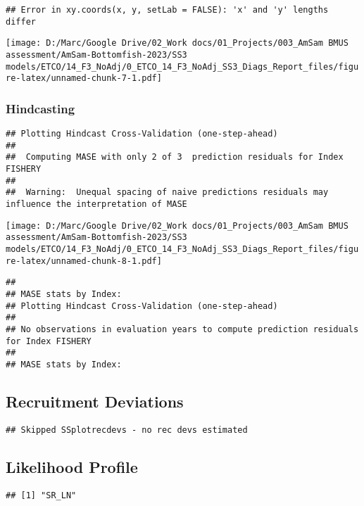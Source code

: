 \documentclass[
]{article}
\begin{document}
\begin{verbatim}
## Error in xy.coords(x, y, setLab = FALSE): 'x' and 'y' lengths differ
\end{verbatim}

\texttt{[image: D:/Marc/Google Drive/02\_Work docs/01\_Projects/003\_AmSam BMUS assessment/AmSam-Bottomfish-2023/SS3 models/ETCO/14\_F3\_NoAdj/0\_ETCO\_14\_F3\_NoAdj\_SS3\_Diags\_Report\_files/figure-latex/unnamed-chunk-7-1.pdf]}

\hypertarget{hindcasting}{%
\subsubsection{Hindcasting}\label{hindcasting}}

\begin{verbatim}
## Plotting Hindcast Cross-Validation (one-step-ahead) 
## 
##  Computing MASE with only 2 of 3  prediction residuals for Index FISHERY 
## 
##  Warning:  Unequal spacing of naive predictions residuals may influence the interpretation of MASE
\end{verbatim}

\texttt{[image: D:/Marc/Google Drive/02\_Work docs/01\_Projects/003\_AmSam BMUS assessment/AmSam-Bottomfish-2023/SS3 models/ETCO/14\_F3\_NoAdj/0\_ETCO\_14\_F3\_NoAdj\_SS3\_Diags\_Report\_files/figure-latex/unnamed-chunk-8-1.pdf]}

\begin{verbatim}
## 
## MASE stats by Index:
## Plotting Hindcast Cross-Validation (one-step-ahead) 
## 
## No observations in evaluation years to compute prediction residuals for Index FISHERY 
## 
## MASE stats by Index:
\end{verbatim}

\hypertarget{recruitment-deviations}{%
\subsection{Recruitment Deviations}\label{recruitment-deviations}}

\begin{verbatim}
## Skipped SSplotrecdevs - no rec devs estimated
\end{verbatim}

\hypertarget{likelihood-profile}{%
\subsection{Likelihood Profile}\label{likelihood-profile}}

\begin{verbatim}
## [1] "SR_LN"
\end{verbatim}
\end{document}
